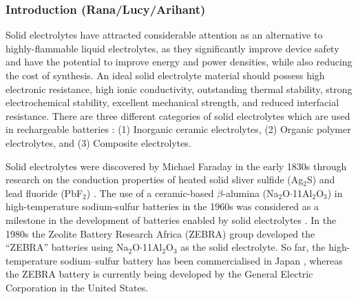 \documentclass[../main.tex]{subfiles}
\begin{document}
\subsubsection{Introduction (Rana/Lucy/Arihant)}

Solid electrolytes have attracted considerable attention as an alternative to highly-flammable liquid electrolytes, as they significantly improve device safety and have the potential to improve energy and power densities, while also reducing the cost of synthesis. \cite{janek_solid_2016, culver_designing_2018, famprikis_fundamentals_2019, goodenough_li-ion_2013, DIRICAN201927} An ideal solid electrolyte material should possess  high electronic resistance, high ionic conductivity, outstanding thermal stability, strong electrochemical stability, excellent mechanical strength, and reduced interfacial resistance. \cite{han2020recent, manthiram2017} There are three different categories of solid electrolytes which are used in rechargeable batteries \cite{DIRICAN201927}: (1) Inorganic ceramic electrolytes, (2) Organic polymer electrolytes, and (3) Composite electrolytes. 

Solid electrolytes were discovered by Michael Faraday in the early 1830s through research on the conduction properties of heated solid sliver sulfide (Ag$_{2}$S) and lead fluoride (PbF$_{2}$) \cite{Faraday1833}. 
The use of a ceramic-based $\beta$-alumina (Na$_{2}$O$\cdot$11Al$_{2}$O$_{3}$) in high-temperature sodium-sulfur batteries in the 1960s was considered as a milestone in the development of batteries enabled by solid electrolytes \cite{armand2008building}. In the 1980s the Zeolite Battery Research Africa (ZEBRA) group developed the ``ZEBRA'' batteries using Na$_{2}$O$\cdot$11Al$_{2}$O$_{3}$ as the solid electrolyte. \cite{ZEBRA}
So far, the high-temperature sodium–sulfur battery has been commercialised in Japan \cite{oshima2004}, whereas the ZEBRA battery is currently being developed by the General Electric Corporation in the United States. \cite{capasso2014} 
\end{document}
